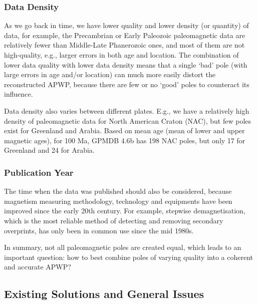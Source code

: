 \subsubsection{Data Density}

As we go back in time, we have lower quality and lower density (or quantity) of
data, for example, the Precambrian or Early Paleozoic paleomagnetic data are
relatively fewer than Middle-Late Phanerozoic ones, and most of them are not
high-quality, e.g., larger errors in both age and location. The combination of
lower data quality with lower data density means that a single `bad' pole (with
large errors in age and/or location) can much more easily distort the
reconstructed APWP, because there are few or no `good' poles to counteract its
influence.

Data density also varies between different plates. E.g., we have a relatively
high density of paleomagnetic data for North American Craton (NAC), but few
poles exist for Greenland and Arabia. Based on mean age (mean of lower and
upper magnetic ages), for 100 Ma, GPMDB 4.6b has 198 NAC poles, but
only 17 for Greenland and 24 for Arabia.

\subsubsection{Publication Year}

The time when the data was published should also be considered, because
magnetism measuring methodology, technology and equipments have been improved
since the early 20th century. For example, stepwise demagnetisation, which is
the most reliable method of detecting and removing secondary overprints, has
only been in common use since the mid 1980s.

In summary, not all paleomagnetic poles are created equal, which leads to an
important question: how to best combine poles of varying quality into a
coherent and accurate APWP\@?

\subsection{Existing Solutions and General Issues}

